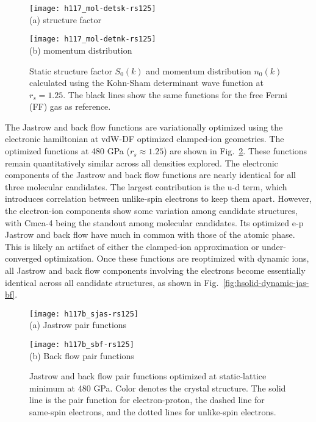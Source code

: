 \begin{figure}[h]
\centering
\begin{minipage}{0.49\textwidth}
\centering
\texttt{[image: h117\_mol-detsk-rs125]}\\
(a) structure factor
\end{minipage}
\begin{minipage}{0.49\textwidth}
\centering
\texttt{[image: h117\_mol-detnk-rs125]}\\
(b) momentum distribution
\end{minipage}
\caption{Static structure factor $S_0(k)$ and momentum distribution $n_0(k)$ calculated using the Kohn-Sham determinant wave function at $r_s=1.25$. The black lines show the same functions for the free Fermi (FF) gas as reference.}
\label{fig:hsolid-det-sk-nk}
\end{figure}

The Jastrow and back flow functions are variationally optimized using the electronic hamiltonian at vdW-DF optimized clamped-ion geometries. The optimized functions at 480 GPa ($r_s\approx 1.25$) are shown in Fig.~\ref{fig:hsolid-static-jas-bf}.
These functions remain quantitatively similar across all densities explored.
The electronic components of the Jastrow and back flow functions are nearly identical for all three molecular candidates.
The largest contribution is the u-d term, which introduces correlation between unlike-spin electrons to keep them apart.
However, the electron-ion components show some variation among candidate structures, with Cmca-4 being the standout among molecular candidates.
Its optimized e-p Jastrow and back flow have much in common with those of the atomic phase.
This is likely an artifact of either the clamped-ion approximation or under-converged optimization. Once these functions are reoptimized with dynamic ions, all Jastrow and back flow components involving the electrons become essentially identical across all candidate structures, as shown in Fig.~\ref{fig:hsolid-dynamic-jas-bf}.

\begin{figure}[h]
\centering
\begin{minipage}{0.49\textwidth}
\centering
\texttt{[image: h117b\_sjas-rs125]}\\
(a) Jastrow pair functions
\end{minipage}
\begin{minipage}{0.49\textwidth}
\centering
\texttt{[image: h117b\_sbf-rs125]}\\
(b) Back flow pair functions
\end{minipage}
\caption{Jastrow and back flow pair functions optimized at static-lattice minimum at 480 GPa. Color denotes the crystal structure. The solid line is the pair function for electron-proton, the dashed line for same-spin electrons, and the dotted lines for unlike-spin electrons.}
\label{fig:hsolid-static-jas-bf}
\end{figure}

